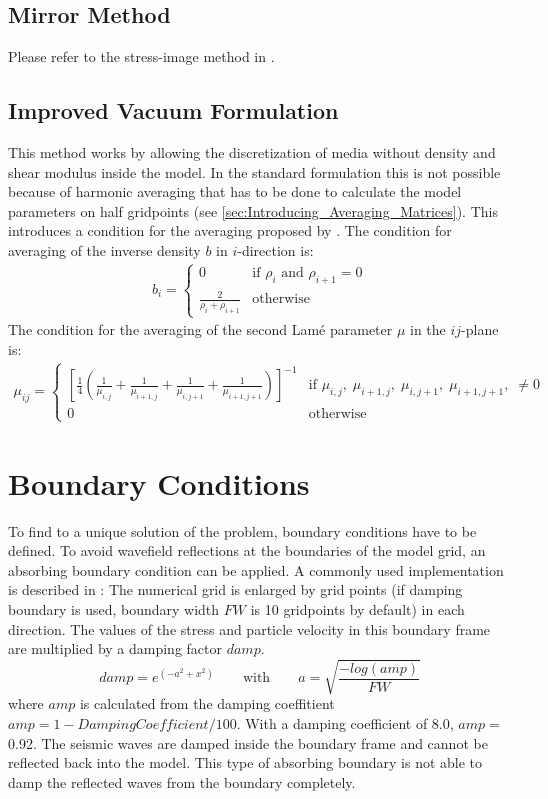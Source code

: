 \documentclass[pdftex,a4paper,parskip,listof=totoc,bibliography=totoc,onehalfspacing,12pt]{scrreprt}
\begin{document}
\subsection{Mirror Method}
Please refer to the stress-image method in \cite{levander1988fourth}.

\subsection{Improved Vacuum Formulation}
This method works by allowing the discretization of media without density and shear modulus inside the model. In the standard formulation this is not possible because of harmonic averaging that has to be done to calculate the model parameters on half gridpoints (see \ref{sec:Introducing_Averaging_Matrices}). This introduces a condition for the averaging proposed by \cite{zeng2012improved}. The condition for averaging of the inverse density $b$ in $i$-direction is:
\begin{align}
 b_i = \begin{cases}
        0 & \text{if }\rho_i\text{ and }\rho_{i+1}=0\\
        \frac{2}{\rho_i+\rho_{i+1}} & \text{otherwise}
       \end{cases}
\end{align}
The condition for the averaging of the second Lam\'e parameter $\mu$ in the $ij$-plane is:
\begin{align}
 \mu_{ij} = \begin{cases}
        \left[\frac{1}{4}\left(\frac{1}{\mu_{i,j}}+\frac{1}{\mu_{i+1,j}}+\frac{1}{\mu_{i,j+1}}+\frac{1}{\mu_{i+1,j+1}}\right)\right]^{-1} & \text{if }\mu_{i,j},\;\mu_{i+1,j},\;\mu_{i,j+1},\;\mu_{i+1,j+1},\;\neq 0\\
        0 & \text{otherwise}
       \end{cases}
\end{align}

\section{Boundary Conditions}
To find to a unique solution of the problem, boundary conditions have to be defined. 
To avoid wavefield reflections at the boundaries of the model grid, an absorbing boundary condition can be applied. A commonly used implementation is described in \cite{cerjan1985nonreflecting}: The numerical grid is enlarged by grid points (if damping boundary is used, boundary width $FW$  is 10 gridpoints by default) in each direction. The values of the stress and particle velocity in this boundary frame are multiplied by a damping factor $damp$.
\begin{equation}
	damp= e^{\left(-a^2+x^2\right)} \qquad \text{with} \qquad a= \sqrt{\frac{-log(amp)}{FW}}
\end{equation}
where $amp$ is calculated from the damping coeffitient $amp= 1-{DampingCoefficient}/{100}$. With a damping coefficient of \SI{8.0}{}, $amp=$ \SI{0.92}{}. The seismic waves are damped inside the boundary frame and cannot be reflected back into the model. This type of absorbing boundary is not able to damp the reflected waves from the boundary completely.
\end{document}
